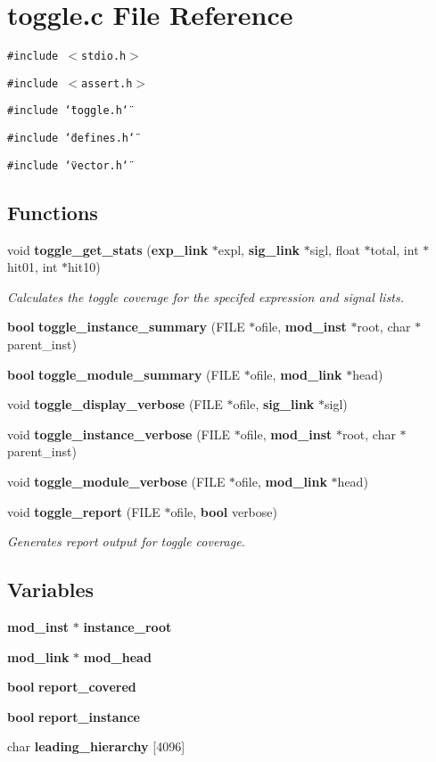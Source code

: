 \section{toggle.c File Reference}
\label{toggle_8c}
{\tt \#include $<$stdio.h$>$}\par
{\tt \#include $<$assert.h$>$}\par
{\tt \#include \char`\"{}toggle.h\char`\"{}}\par
{\tt \#include \char`\"{}defines.h\char`\"{}}\par
{\tt \#include \char`\"{}vector.h\char`\"{}}\par
\subsection*{Functions}
\begin{CompactItemize}
\item 
void {\bf toggle\_\-get\_\-stats} ({\bf exp\_\-link} $\ast$expl, {\bf sig\_\-link} $\ast$sigl, float $\ast$total, int $\ast$hit01, int $\ast$hit10)
\begin{CompactList}\small\item\em Calculates the toggle coverage for the specifed expression and signal lists. \item\end{CompactList}\item 
{\bf bool} {\bf toggle\_\-instance\_\-summary} (FILE $\ast$ofile, {\bf mod\_\-inst} $\ast$root, char $\ast$parent\_\-inst)
\item 
{\bf bool} {\bf toggle\_\-module\_\-summary} (FILE $\ast$ofile, {\bf mod\_\-link} $\ast$head)
\item 
void {\bf toggle\_\-display\_\-verbose} (FILE $\ast$ofile, {\bf sig\_\-link} $\ast$sigl)
\item 
void {\bf toggle\_\-instance\_\-verbose} (FILE $\ast$ofile, {\bf mod\_\-inst} $\ast$root, char $\ast$parent\_\-inst)
\item 
void {\bf toggle\_\-module\_\-verbose} (FILE $\ast$ofile, {\bf mod\_\-link} $\ast$head)
\item 
void {\bf toggle\_\-report} (FILE $\ast$ofile, {\bf bool} verbose)
\begin{CompactList}\small\item\em Generates report output for toggle coverage. \item\end{CompactList}\end{CompactItemize}
\subsection*{Variables}
\begin{CompactItemize}
\item 
{\bf mod\_\-inst} $\ast$ {\bf instance\_\-root}
\item 
{\bf mod\_\-link} $\ast$ {\bf mod\_\-head}
\item 
{\bf bool} {\bf report\_\-covered}
\item 
{\bf bool} {\bf report\_\-instance}
\item 
char {\bf leading\_\-hierarchy} [4096]
\end{CompactItemize}



